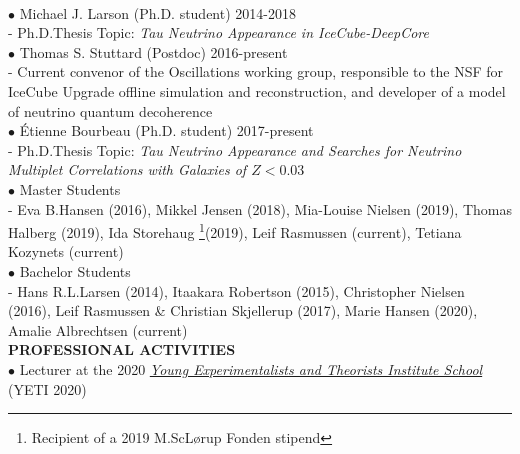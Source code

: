 \documentclass[a4paper,11pt]{article}
\renewcommand{\smallskip} {\vspace{0.1in}}
\begin{document}
\vspace{0.2cm}
\\
%
$\bullet$ Michael J. Larson (Ph.D. student) \hfill 2014-2018\\
\indent - Ph.D.\@ Thesis Topic: {\it Tau Neutrino Appearance in IceCube-DeepCore} 
\vspace{0.2cm}
\\
%
$\bullet$ Thomas S. Stuttard (Postdoc) \hfill 2016-present\\
\indent - Current convenor of the Oscillations working group, responsible to the NSF for IceCube Upgrade offline simulation and reconstruction, and developer of a model of neutrino quantum decoherence
\vspace{0.2cm}
\\
%
$\bullet$ \'Etienne Bourbeau (Ph.D. student) \hfill 2017-present\\
\indent - Ph.D.\@ Thesis Topic: {\it Tau Neutrino Appearance and Searches for Neutrino Multiplet Correlations with Galaxies of $Z<0.03$}\
\vspace{0.2cm}
\\
%
$\bullet$ Master Students\\
\indent - Eva B.\@ Hansen (2016), Mikkel Jensen (2018), Mia-Louise Nielsen (2019), Thomas Halberg (2019), Ida Storehaug \footnote{Recipient of a 2019 M.Sc\@ L{\o}rup Fonden stipend}(2019), Leif Rasmussen (current), Tetiana Kozynets (current)
\vspace{0.2cm}
\\
%
$\bullet$ Bachelor Students\\
\indent - Hans R.\@ L.\@ Larsen (2014), Itaakara Robertson (2015), Christopher Nielsen (2016), Leif Rasmussen \& Christian Skjellerup (2017), Marie Hansen (2020), Amalie Albrechtsen (current)
\vspace{0.2cm}
%
~\smallskip\\
%
%
%
\textbf{PROFESSIONAL ACTIVITIES ~~\hrulefill}\smallskip\\ 
%
$\bullet$ Lecturer at the 2020 \href{https://conference.ippp.dur.ac.uk/event/830/overview}{\textit{Young Experimentalists and Theorists Institute School}} (YETI 2020)\smallskip \\
\end{document}
